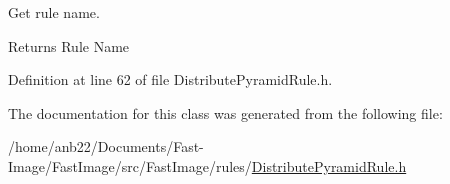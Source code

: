 Get rule name. 

\begin{DoxyReturn}{Returns}
Rule Name 
\end{DoxyReturn}


Definition at line 62 of file Distribute\+Pyramid\+Rule.\+h.



The documentation for this class was generated from the following file\+:\begin{DoxyCompactItemize}
\item 
/home/anb22/\+Documents/\+Fast-\/\+Image/\+Fast\+Image/src/\+Fast\+Image/rules/\hyperlink{DistributePyramidRule_8h}{Distribute\+Pyramid\+Rule.\+h}\end{DoxyCompactItemize}
